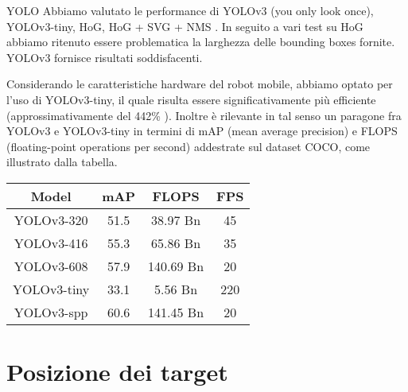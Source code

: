 \documentclass[aspectratio=169, leqno]{beamer}
\begin{document}
	\begin{frame}{YOLO}
		Abbiamo valutato le performance di YOLOv3 (you only look once),
		YOLOv3-tiny, HoG, HoG + SVG + NMS . In seguito a vari test su HoG abbiamo
		ritenuto essere problematica la larghezza delle bounding boxes fornite.
		YOLOv3 fornisce risultati soddisfacenti.
		
		Considerando le caratteristiche hardware del robot mobile, abbiamo
		optato per l'uso di YOLOv3-tiny, il quale risulta essere
		significativamente più efficiente (approssimativamente del 442\%
		\cite{tiny_yolo}). Inoltre è rilevante in tal senso un paragone fra
		YOLOv3 e YOLOv3-tiny in termini di mAP (mean average precision) e FLOPS
		(floating-point operations per second) addestrate sul dataset COCO,
		come illustrato dalla tabella.
		
		\begin{table}[htpb]
			\centering
			\begin{tabular}{ c c c c } 
				\hline
				\textbf{Model} & \textbf{mAP} & \textbf{FLOPS} & \textbf{FPS} \\
				\hline	
				 YOLOv3-320    & 51.5  &  38.97  Bn  &  45  \\ 
				 YOLOv3-416    & 55.3  &  65.86  Bn  &  35  \\ 
				 YOLOv3-608    & 57.9  &  140.69 Bn  &  20  \\ 
				 YOLOv3-tiny   & 33.1  &  5.56   Bn  &  220 \\
				 YOLOv3-spp    & 60.6  &  141.45 Bn  &  20  \\
				\hline
			\end{tabular}
			\label{tab:comparison}
		\end{table}
	\end{frame}

	\section{Posizione dei target}\label{sec:Posizione-dei-target}
	\frame{\sectionpage}
	
\end{document}
